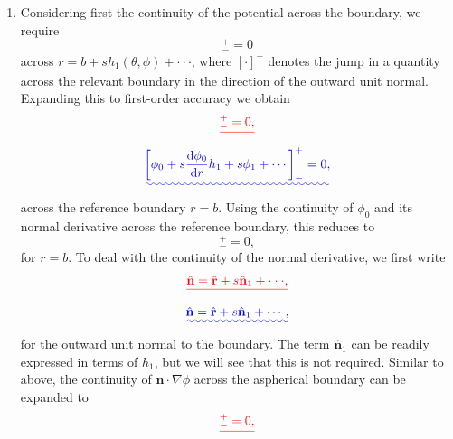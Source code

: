 \documentclass[a4paper,10pt]{paper}
\providecommand{\DIFadd}[1]{{\protect\color{blue}\uwave{#1}}} %
\providecommand{\DIFdel}[1]{{\protect\color{red}\sout{#1}}}                      %
\providecommand{\DIFaddbegin}{} %
\providecommand{\DIFaddend}{} %
\providecommand{\DIFdelbegin}{} %
\providecommand{\DIFdelend}{} %
\begin{document}
\begin{enumerate}
 \item Considering first the continuity of the potential across the boundary, we require
\begin{equation*}
    [\phi]_{-}^{+}=0
\end{equation*}
across \DIFdelbegin \DIFdel{$r=b+sh_{1}(\theta,\phi)+\cdot\cdot\cdot$}\DIFdelend \DIFaddbegin \DIFadd{$r=b+sh_{1}(\theta,\varphi)+\cdots$}\DIFaddend , where $[\cdot]_{-}^{+}$ denotes the jump in a quantity across the relevant boundary in the direction of the outward unit normal. Expanding this to first-order accuracy we obtain
\DIFdelbegin \begin{displaymath}
    [\DIFdel{\phi_{0}+s\frac{d\phi_{0}}{dr}h_{1}+s\phi_{1}+\cdot\cdot\cdot}]\DIFdel{_{-}^{+}=0,
}\end{displaymath}%
\DIFdelend \DIFaddbegin \begin{equation*}
    \DIFadd{\left[\phi_{0}+s\frac{\ddns\phi_{0}}{\ddns r}h_{1}+s\phi_{1}+\cdots\right]_{-}^{+}=0,
}\end{equation*}\DIFaddend 
across the reference boundary $r=b$. Using the continuity of $\phi_{0}$ and its normal derivative across the reference boundary, this reduces to
\begin{equation*}
    [\phi_{1}]_{-}^{+}=0,
\end{equation*}
for $r=b$. To deal with the continuity of the normal derivative, we first write
\DIFdelbegin \begin{displaymath}
    \DIFdel{\hat{\mathbf{n}}=\hat{\mathbf{r}}+s\hat{\mathbf{n}}_{1}+\cdot\cdot\cdot,
}\end{displaymath}%
\DIFdelend \DIFaddbegin \begin{equation*}
    \DIFadd{\hat{\mathbf{n}}=\hat{\mathbf{r}}+s\hat{\mathbf{n}}_{1}+\cdots,
}\end{equation*}\DIFaddend 
for the outward unit normal to the boundary. The term $\hat{\mathbf{n}}_{1}$ can be readily expressed in terms of $h_{1}$, but we will see that this is not required. Similar to above, the continuity of $\hat{\mathbf{n}}\cdot\nabla\phi$ across the aspherical boundary can be expanded to
\DIFdelbegin \begin{displaymath}
    [\DIFdel{\hat{\mathbf{r}}\cdot\nabla\phi_{0}+s(\hat{\mathbf{r}}\cdot\nabla)(\hat{\mathbf{r}}\cdot\nabla\phi_{0})h_{1}+s\hat{\mathbf{n}}_{1}\cdot\nabla\phi_{0}+s\hat{\mathbf{r}}\cdot\nabla\phi_{1}+\cdot\cdot\cdot}]\DIFdel{_{-}^{+}=0,
}\end{displaymath}%
\DIFdelend \DIFaddbegin \begin{equation*}

\end{equation*}
\end{enumerate}
\end{document}
